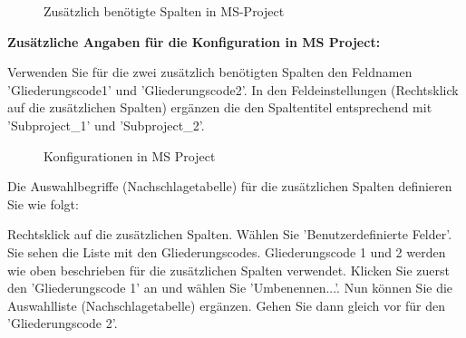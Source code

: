 \begin{figure}[H]
\caption{Zusätzlich benötigte Spalten in MS-Project}
\end{figure}

\textbf{Zusätzliche Angaben für die Konfiguration in MS Project:} 

\vspace{\baselineskip}

Verwenden Sie für die zwei zusätzlich benötigten Spalten den Feldnamen 'Gliederungscode1' und 'Gliederungscode2'. In den Feldeinstellungen (Rechtsklick auf die zusätzlichen Spalten) ergänzen die den Spaltentitel entsprechend mit 'Subproject\_1' und 'Subproject\_2'.

\begin{figure}[H]
\caption{Konfigurationen in MS Project}
\end{figure}

Die Auswahlbegriffe (Nachschlagetabelle) für die zusätzlichen Spalten definieren Sie wie folgt:

\vspace{\baselineskip}

Rechtsklick auf die zusätzlichen Spalten. Wählen Sie 'Benutzerdefinierte Felder'. Sie sehen die Liste mit den Gliederungscodes. Gliederungscode 1 und 2 werden wie oben beschrieben für die zusätzlichen Spalten verwendet. Klicken Sie zuerst den 'Gliederungscode 1' an und wählen Sie 'Umbenennen...'. Nun können Sie die Auswahlliste (Nachschlagetabelle) ergänzen. Gehen Sie dann gleich vor für den 'Gliederungscode 2'.

